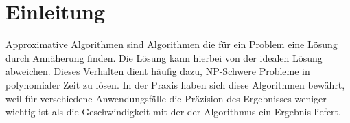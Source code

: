 \section{Einleitung}
Approximative Algorithmen sind Algorithmen die für ein Problem eine Lösung durch Annäherung finden. Die Lösung kann hierbei von der idealen Lösung abweichen. Dieses Verhalten dient häufig dazu, NP-Schwere Probleme in polynomialer Zeit zu lösen.
In der Praxis haben sich diese Algorithmen bewährt, weil für verschiedene Anwendungsfälle die Präzision des Ergebnisses weniger wichtig ist als die Geschwindigkeit mit der der Algorithmus ein Ergebnis liefert.

